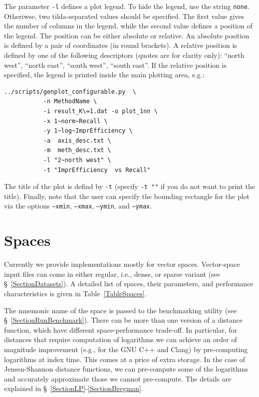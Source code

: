 \documentclass[runningheads,a4paper]{llncs}
\newcommand{\ttt}[1]{\texttt{#1}}
\begin{document}
{The parameter \ttt{-l} defines a plot legend.
To hide the legend, use the string \ttt{none}.
Otheriwse, two tilda-separated values should be specified.
The first value gives the number of columns in the legend, while the second value
defines a position of the legend. The position can be either 
absolute or relative.
An absolute position is defined by a pair of coordinates (in round brackets).
A relative position is defined by one of the following descriptors 
(quotes are for clarity only): ``north west'', ``north east'', ``south west'', ``south east''.
If the relative position is specified, the legend is printed inside the main
plotting area, e.g.:
\begin{verbatim}
../scripts/genplot_configurable.py  \
           -n MethodName \
           -i result_K\=1.dat -o plot_1nn \
           -x 1~norm~Recall \
           -y 1~log~ImprEfficiency \
           -a  axis_desc.txt \
           -m  meth_desc.txt \
           -l "2~north west" \
           -t "ImprEfficiency  vs Recall"
\end{verbatim}

The title of the plot is defind by \ttt{-t} (specify \ttt{-t ""} if you do not want
to print the title). Finally, note that the user can specify the bounding rectangle for the plot
via the options \ttt{--xmin}, \ttt{--xmax}, \ttt{--ymin}, and \ttt{--ymax}.

\section{Spaces}\label{SectionSpaces}
Currently we provide implementations mostly for vector spaces.
Vector-space input files can come in either regular, i.e., dense,
or sparse variant (see \S~\ref{SectionDatasets}). 
A detailed list of spaces, their parameters, 
and performance characteristics is given in Table~\ref{TableSpaces}.

The mnemonic name of the space is passed to the benchmarking utility (see \S~\ref{SectionRunBenchmark}).
There can be more than one version of a distance function,
which have different space-performance trade-off.
In particular, for distances that require computation of logarithms 
we can achieve an order of magnitude improvement (e.g., for the GNU C++
and Clang) by pre-computing
logarithms at index time. This comes at a price of extra storage. 
In the case of Jensen-Shannon distance functions, we can pre-compute some 
of the logarithms and accurately approximate those we cannot pre-compute.
The details are explained in \S~\ref{SectionLP}-\ref{SectionBregman}.

}
\end{document}
